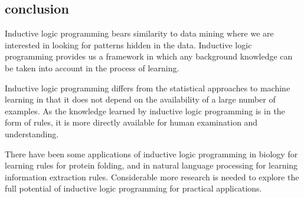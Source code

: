 \documentclass{article}
\theoremstyle{mytheoremstyle}
\theoremstyle{mytheoremstyle}
\theoremstyle{myproblemstyle}
\begin{document}
\subsection{conclusion}
Inductive logic programming bears similarity to data mining where we are interested in looking for patterns hidden in the data. Inductive logic programming provides us a framework in which any background knowledge can be taken into account in the process of learning.

Inductive logic programming differs from the statistical approaches to machine learning in that it does not depend on the availability of a large number of examples. As the knowledge learned by inductive logic programming is in the form of rules, it is more directly available for human examination and understanding.

There have been some applications of inductive logic programming in biology for learning rules for protein folding, and in natural language processing for learning information extraction rules. Considerable more research is needed to explore the full potential of inductive logic programming for practical applications.
\end{document}
